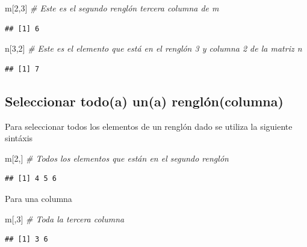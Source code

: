 \documentclass[
]{book}
\newenvironment{Shaded}{\begin{snugshade}}{\end{snugshade}}
\newcommand{\CommentTok}[1]{\textcolor[rgb]{0.56,0.35,0.01}{\textit{#1}}}
\newcommand{\DecValTok}[1]{\textcolor[rgb]{0.00,0.00,0.81}{#1}}
\newcommand{\NormalTok}[1]{#1}
\begin{document}
\begin{Shaded}
\begin{Highlighting}[]
\NormalTok{m[}\DecValTok{2}\NormalTok{,}\DecValTok{3}\NormalTok{]  }\CommentTok{\# Este es el segundo renglón tercera columna de m}
\end{Highlighting}
\end{Shaded}

\begin{verbatim}
## [1] 6
\end{verbatim}

\begin{Shaded}
\begin{Highlighting}[]
\NormalTok{n[}\DecValTok{3}\NormalTok{,}\DecValTok{2}\NormalTok{]  }\CommentTok{\# Este es el elemento que está en el renglón 3 y columna 2 de la matriz n }
\end{Highlighting}
\end{Shaded}

\begin{verbatim}
## [1] 7
\end{verbatim}

\subsection{Seleccionar todo(a) un(a) renglón(columna)}\label{seleccionar-todoa-una-rengluxf3ncolumna}

Para seleccionar todos los elementos de un renglón dado se utiliza la siguiente sintáxis

\begin{Shaded}
\begin{Highlighting}[]
\NormalTok{m[}\DecValTok{2}\NormalTok{,]  }\CommentTok{\# Todos los elementos que están en el segundo renglón}
\end{Highlighting}
\end{Shaded}

\begin{verbatim}
## [1] 4 5 6
\end{verbatim}

Para una columna

\begin{Shaded}
\begin{Highlighting}[]
\NormalTok{m[,}\DecValTok{3}\NormalTok{] }\CommentTok{\# Toda la tercera columna}
\end{Highlighting}
\end{Shaded}

\begin{verbatim}
## [1] 3 6
\end{verbatim}
\end{document}

